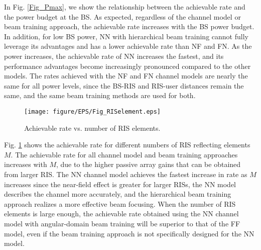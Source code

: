 \documentclass[lettersize, journal]{IEEEtran}
\begin{document}
In Fig. {\ref{Fig_Pmax}}, we show the relationship between the achievable rate and the power budget at the BS.
As expected, regardless of the channel model or beam training approach,  the achievable rate increases with the BS power budget.
In addition, for low BS power,  NN with hierarchical beam training cannot fully leverage its advantages and has a lower achievable rate than NF and FN.
As the power increases, the achievable rate of NN increases the fastest, and its performance advantages become increasingly pronounced compared to the other models.
The rates achieved with the NF and FN channel models are nearly the same for all power levels, since the BS-RIS and RIS-user distances remain the same, and the same beam training methods are used for both.


\begin{figure}[t]
\centering
\texttt{[image: figure/EPS/Fig\_RISelement.eps]}
\caption{Achievable rate vs. number of RIS elements.}
\label{Fig_RISelement}
\end{figure}

Fig. {\ref{Fig_RISelement}} shows the achievable rate for different numbers of RIS reflecting elements $M$. 
The achievable rate for all channel model and beam training approaches increases with $M$, due to the higher passive array gains that can be obtained from larger RIS.
The NN channel model achieves the fastest increase in rate as $M$ increases since the near-field effect is greater for larger RISs,  the NN model describes the channel more accurately, and the hierarchical beam training approach realizes a more effective beam focusing.
When the number of RIS elements is large enough, the achievable rate obtained using the NN channel model with angular-domain beam training will be superior to that of the FF model, even if the beam training approach is not specifically designed for the NN model.
\end{document}
